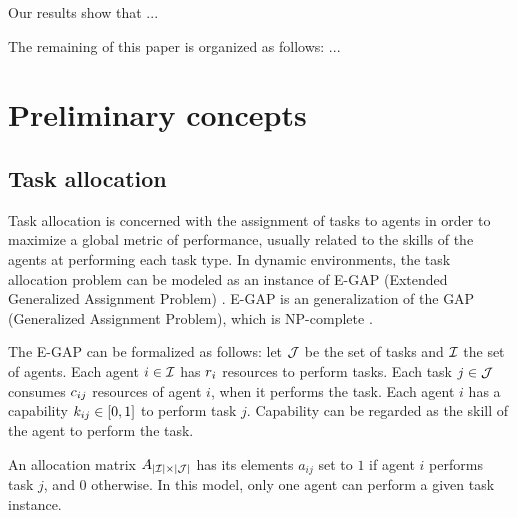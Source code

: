 \documentclass[a4paper]{sbgames}
\begin{document}
Our results show that ...

The remaining of this paper is organized as follows: ...

\section{Preliminary concepts}
\label{sec:concepts}


\subsection{Task allocation}
\label{sec:ta}

Task allocation is concerned with the assignment of tasks to agents in order to maximize a global metric of performance, usually related to the skills of the agents at performing each task type. In dynamic environments, the task allocation problem can be modeled as an instance of E-GAP (Extended Generalized Assignment Problem) \cite{Scerri+2005}. E-GAP is an generalization of the GAP (Generalized Assignment Problem), which is NP-complete \cite{Shmoys&Tardos1993}. 

The E-GAP can be formalized as follows: let $\mathcal{J}$ be the set of tasks and $\mathcal{I}$ the set of agents. Each agent $i \in \mathcal{I}$ has $r_{i}$ resources to perform tasks. Each task $j \in \mathcal{J}$ consumes $c_{ij}$ resources of agent $i$, when it performs the task. Each agent $i$ has a capability $k_{ij} \in [0,1]$ to perform task $j$. Capability can be regarded as the skill of the agent to perform the task. %

An allocation matrix $A_{|\mathcal{I}| \times |\mathcal{J}|}$ has its elements $a_{ij}$ set to $1$ if agent $i$ performs task $j$, and 0 otherwise. In this model, only one agent can perform a given task instance. %

\end{document}
